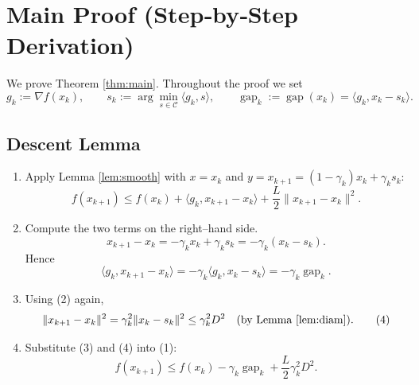 \documentclass{article}
\newcommand{\gap}{\operatorname{gap}}
\begin{document}
\section{Main Proof (Step‑by‑Step Derivation)}
\label{sec:proof}
We prove Theorem \ref{thm:main}.  Throughout the proof we set
\[
g_{k}:=\nabla f(x_{k}),\qquad
s_{k}:=\arg\min_{s\in\mathcal C}\langle g_{k},s\rangle,
\qquad
\gap_{k}:=\gap(x_{k})=\langle g_{k},x_{k}-s_{k}\rangle .
\]

\subsection*{Descent Lemma}
\begin{enumerate}
\item[Step 1.] Apply Lemma \ref{lem:smooth} with $x=x_{k}$ and $y=x_{k+1}=(1-\gamma_{k})x_{k}+\gamma_{k}s_{k}$:
\[
f(x_{k+1})\le f(x_{k})+\langle g_{k},x_{k+1}-x_{k}\rangle
+\frac{L}{2}\|x_{k+1}-x_{k}\|^{2}.
\tag{1}
\]

\item[Step 2.] Compute the two terms on the right–hand side.
\[
x_{k+1}-x_{k}= -\gamma_{k}x_{k}+\gamma_{k}s_{k}
            = -\gamma_{k}(x_{k}-s_{k}).
\tag{2}
\]
Hence
\[
\langle g_{k},x_{k+1}-x_{k}\rangle
= -\gamma_{k}\langle g_{k},x_{k}-s_{k}\rangle
= -\gamma_{k}\gap_{k}.
\tag{3}
\]

\item[Step 3.] Using (2) again,
\[
\|x_{k+1}-x_{k}\|^{2}
= \gamma_{k}^{2}\|x_{k}-s_{k}\|^{2}
\le \gamma_{k}^{2}D^{2}
\quad\text{(by Lemma \ref{lem:diam})}.
\tag{4}
\]

\item[Step 4.] Substitute (3) and (4) into (1):
\[
f(x_{k+1})\le f(x_{k})-\gamma_{k}\gap_{k}
+\frac{L}{2}\gamma_{k}^{2}D^{2}.
\tag{5}
\]
\end{enumerate}
\end{document}
